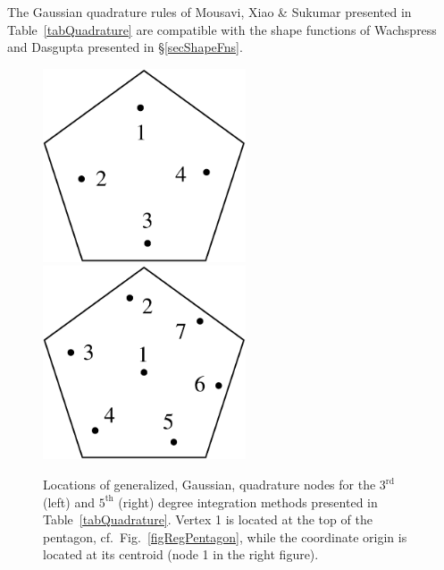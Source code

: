 The Gaussian quadrature rules of Mousavi, Xiao \& Sukumar \cite{Mousavietal10} presented in Table~\ref{tabQuadrature} are compatible with the shape functions of Wachspress \cite{Wachspress75,Wachspress16} and Dasgupta \cite{Dasgupta03} presented in \S\ref{secShapeFns}.

\begin{figure}
    \centering
    \includegraphics[width=6cm]{figures/pentagon_degree3.pdf}
    \hspace{1cm}
    \includegraphics[width=6cm]{figures/pentagon_degree5.pdf}
    \caption{Locations of generalized, Gaussian, quadrature nodes for the $3^{\mathrm{rd}}$ (left) and $5^{\mathrm{th}}$ (right) degree integration methods presented in Table~\ref{tabQuadrature}.  Vertex 1 is located at the top of the pentagon, cf.\ Fig.~\ref{figRegPentagon}, while the coordinate origin is located at its centroid (node 1 in the right figure).}
    \label{figQuadrature}
\end{figure}

